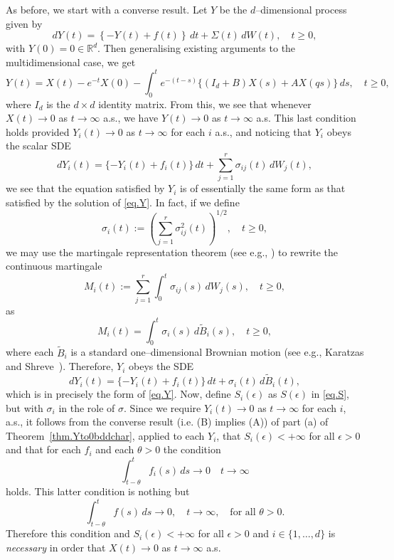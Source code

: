 \documentclass[a4paper,10pt,reqno]{amsart}
\numberwithin{equation}{section}
\theoremstyle{definition}
\theoremstyle{remark}
\DeclareMathOperator{\1}{\mathbbm 1}
\begin{document}
As before, we start with a converse result. Let $Y$ be the $d$--dimensional process given by 
\[
dY(t)=\left\{-Y(t)+f(t)\right\}\,dt+\Sigma(t)\,dW(t), \quad t\geq 0,
\] 
with $Y(0)=0\in\mathbb{R}^d$. Then generalising existing arguments to the multidimensional case, we get 
\[
Y(t)= X(t)-e^{-t}X(0)-\int_{0}^t e^{-(t-s)}\{(I_d+B)X(s)+AX(qs)\}\,ds, \quad t\geq 0, 
\] 
where $I_d$ is the $d\times d$ identity matrix. From this, we see that whenever $X(t)\to 0$ as $t\to\infty$ a.s., we have $Y(t)\to 0$ as $t\to\infty$ a.s. This last condition holds provided $Y_i(t)\to 0$ as $t\to\infty$ for each $i$ a.s., and noticing that $Y_i$ obeys the scalar SDE 
\[
dY_i(t)=\{-Y_i(t)+f_i(t)\}\,dt + \sum_{j=1}^r \sigma_{ij}(t)\,dW_j(t),
\]
we see that the equation satisfied by $Y_i$ is of essentially the same form as that satisfied by the solution of \eqref{eq.Y}. In fact, if we define 
\begin{equation} \label{eq.sigmai}
\sigma_i(t):=\left(\sum_{j=1}^r \sigma_{ij}^2(t)\right)^{1/2}, \quad t\geq 0,
\end{equation}
we may use the martingale representation theorem (see e.g., \cite{KS}) to rewrite the continuous martingale 
\[
M_i(t):=\sum_{j=1}^r \int_{0}^t \sigma_{ij}(s)\,dW_j(s), \quad t\geq 0,
\]
as 
\[
M_i(t)=\int_0^t \sigma_i(s)\,d\tilde{B}_i(s), \quad t\geq 0,
\]
where each $\tilde{B}_i$ is a standard one--dimensional Brownian motion (see e.g., Karatzas and Shreve~\cite{KS}). Therefore, $Y_i$ obeys the SDE
\[
dY_i(t)=\{-Y_i(t)+f_i(t)\}\,dt + \sigma_i(t)\,d\tilde{B}_i(t),
\]
which is in precisely the form of \eqref{eq.Y}. Now, define 
$S_i(\epsilon)$ as $S(\epsilon)$ in \eqref{eq.S}, but with $\sigma_i$ in the role of $\sigma$. Since we require $Y_i(t)\to 0$ as $t\to\infty$ for each $i$, a.s., it follows from the converse result (i.e. (B) implies (A)) of part (a) of  Theorem~\ref{thm.Yto0bddchar}, applied to each $Y_i$, that $S_i(\epsilon)<+\infty$ for all $\epsilon>0$ and that for each $f_i$ and each $\theta>0$ the condition 
\[
\int_{t-\theta}^t f_i(s)\,ds \to 0 \quad t\to\infty
\]
holds. This latter condition is nothing but 
\begin{equation} \label{eq.multidimf}
\int_{t-\theta}^t f(s)\,ds\to 0, \quad t\to\infty, \quad \text{for all $\theta>0$}.
\end{equation}
Therefore this condition and $S_i(\epsilon)<+\infty$ for all $\epsilon>0$ and $i\in \{1,\ldots,d\}$ is \textit{necessary} in order that $X(t)\to 0$ as $t\to\infty$ a.s.
\end{document}
